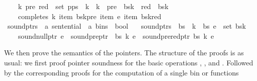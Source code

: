 \begin{isabellebody}
\ \ \ \ {\isacharparenleft}{\kern0pt}k{\isacharprime}{\kern0pt}{\isacharcomma}{\kern0pt}\ pre{\isacharcomma}{\kern0pt}\ red{\isacharparenright}{\kern0pt}\ {\isasymin}\ set\ {\isacharparenleft}{\kern0pt}p{\isacharhash}{\kern0pt}ps{\isacharparenright}{\kern0pt}\ {\isasymlongrightarrow}\ k{\isacharprime}{\kern0pt}\ {\isacharless}{\kern0pt}\ k\ {\isasymand}\ pre\ {\isacharless}{\kern0pt}\ {\isacharbar}{\kern0pt}bs{\isacharbang}{\kern0pt}k{\isacharprime}{\kern0pt}{\isacharbar}{\kern0pt}\ {\isasymand}\ red\ {\isacharless}{\kern0pt}\ {\isacharbar}{\kern0pt}bs{\isacharbang}{\kern0pt}k{\isacharbar}{\kern0pt}\ {\isasymand}\isanewline
\ \ \ \ completes\ k\ {\isacharparenleft}{\kern0pt}item\ {\isacharparenleft}{\kern0pt}bs{\isacharbang}{\kern0pt}k{\isacharprime}{\kern0pt}{\isacharbang}{\kern0pt}pre{\isacharparenright}{\kern0pt}{\isacharparenright}{\kern0pt}\ {\isacharparenleft}{\kern0pt}item\ e{\isacharparenright}{\kern0pt}\ {\isacharparenleft}{\kern0pt}item\ {\isacharparenleft}{\kern0pt}bs{\isacharbang}{\kern0pt}k{\isacharbang}{\kern0pt}red{\isacharparenright}{\kern0pt}{\isacharparenright}{\kern0pt}{\isachardoublequoteclose}\isanewline
\isanewline
{}\isamarkupfalse%
\ sound{\isacharunderscore}{\kern0pt}ptrs\ {\isacharcolon}{\kern0pt}{\isacharcolon}{\kern0pt}\ {\isachardoublequoteopen}{\isacharprime}{\kern0pt}a\ sentential\ {\isasymRightarrow}\ {\isacharprime}{\kern0pt}a\ bins\ {\isasymRightarrow}\ bool{\isachardoublequoteclose}\ \isanewline
\ \ {\isachardoublequoteopen}sound{\isacharunderscore}{\kern0pt}ptrs\ {\isasymomega}\ bs\ {\isasymequiv}\ {\isasymforall}k\ {\isacharless}{\kern0pt}\ {\isacharbar}{\kern0pt}bs{\isacharbar}{\kern0pt}{\isachardot}{\kern0pt}\ {\isasymforall}e\ {\isasymin}\ set\ {\isacharparenleft}{\kern0pt}bs{\isacharbang}{\kern0pt}k{\isacharparenright}{\kern0pt}{\isachardot}{\kern0pt}\isanewline
\ \ \ \ sound{\isacharunderscore}{\kern0pt}null{\isacharunderscore}{\kern0pt}ptr\ e\ {\isasymand}\ sound{\isacharunderscore}{\kern0pt}pre{\isacharunderscore}{\kern0pt}ptr\ {\isasymomega}\ bs\ k\ e\ {\isasymand}\ sound{\isacharunderscore}{\kern0pt}prered{\isacharunderscore}{\kern0pt}ptr\ bs\ k\ e{\isachardoublequoteclose}%
\begin{isamarkuptext}%
We then prove the semantics of the pointers. The structure of the proofs is as usual: we first
proof pointer soundness for the basic operations , , and .
Followed by the corresponding proofs for the computation of a single bin or functions 

\end{isamarkuptext}
\end{isabellebody}
